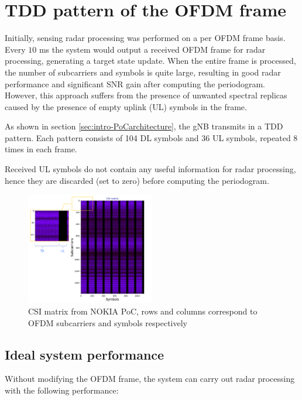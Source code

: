 \chapter{TDD pattern of the OFDM frame}
\label{chap:TDD pattern of the OFDM frame}


Initially, sensing radar processing was performed on a per OFDM frame basis. \protect\newline Every $10$ ms the system would output a received OFDM frame for radar processing, generating a target state update. When the entire frame is processed, the number of subcarriers and symbols is quite large, resulting in good radar performance and significant SNR gain after computing the periodogram. However, this approach suffers from the presence of unwanted spectral replicas caused by the presence of empty uplink (UL) symbols in the frame.
    
As shown in section \ref{sec:intro-PoCarchitecture}, the gNB transmits in a TDD pattern. Each pattern consists of 104 DL symbols and 36 UL symbols, repeated 8 times in each frame.

Received UL symbols do not contain any useful information for radar processing, hence they are discarded (set to zero) before computing the periodogram.

\begin{figure}[H]
    \centering
    \includegraphics[width=0.5\textwidth]{Images/TDDprocessing/CSIMatrix_DLULpattern.png}
    \caption{CSI matrix from NOKIA PoC, rows and columns correspond to OFDM subcarriers and symbols respectively}
    \label{fig:CSIMatrix_DLULpattern}
\end{figure}

\section{Ideal system performance}

Without modifying the OFDM frame, the system can carry out radar processing with the following performance:

